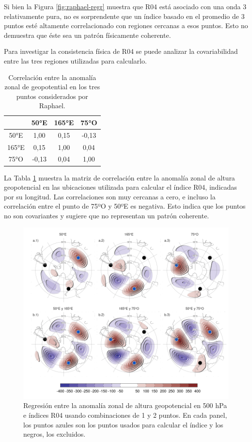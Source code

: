 \documentclass[12pt,oneside,a4paper]{reedthesis}
\begin{document}
Si bien la Figura \ref{fig:raphael-regr} muestra que R04 está asociado con una onda 3 relativamente pura, no es sorprendente que un índice basado en el promedio de 3 puntos esté altamente correlacionado con regiones cercanas a esos puntos.
Esto no demuestra que éste sea un patrón físicamente coherente.

Para investigar la consistencia física de R04 se puede analizar la covariabilidad entre las tres regiones utilizadas para calcularlo.

\begin{table}

\caption{\label{tab:raphael-correlation}Correlación entre la anomalía zonal de geopotential en los tres puntos considerados por Raphael.}
\centering
\begin{tabular}[t]{cccc}
\toprule
 & 50°E & 165°E & 75°O\\
\midrule
50°E & 1,00 & 0,15 & -0,13\\
165°E & 0,15 & 1,00 & 0,04\\
75°O & -0,13 & 0,04 & 1,00\\
\bottomrule
\end{tabular}
\end{table}

La Tabla \ref{tab:raphael-correlation} muestra la matriz de correlación entre la anomalía zonal de altura geopotencial en las ubicaciones utilizada para calcular el índice R04, indicadas por su longitud.
Las correlaciones son muy cercanas a cero, e incluso la correlación entre el punto de 75ºO y 50ºE es negativa.
Esto indica que los puntos no son covariantes y sugiere que no representan un patrón coherente.

\begin{figure}

{\centering \includegraphics{figures/15-onda3/cor-puntos-1} 

}

\caption{Regresión entre la anomalía zonal de altura geopotencial en 500 hPa e índices R04 usando combinaciones de 1 y 2 puntos. En cada panel, los puntos azules son los puntos usados para calcular el índice y los negros, los excluidos.}\label{fig:cor-puntos}
\end{figure}
\end{document}
